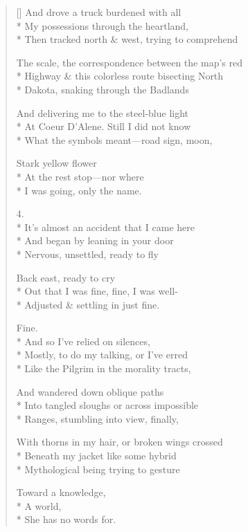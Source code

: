 \begin{verse}[\versewidth]
And drove a truck burdened with all\\*
My possessions through the heartland,\\*
Then tracked north \& west, trying to comprehend

The scale, the correspondence between the map's red\\*
Highway \& this colorless route bisecting North\\*
Dakota, snaking through the Badlands

And delivering me to the steel-blue light\\*
At Coeur D'Alene. Still I did not know\\*
What the symbols meant---road sign, moon,

Stark yellow flower\\*
At the rest stop---nor where\\*
I was going, only the name.

4.\\*
It's almost an accident that I came here\\*
And began by leaning in your door\\*
Nervous, unsettled, ready to fly

Back east, ready to cry\\*
Out that I was fine, fine, I was well-\\*
Adjusted \& settling in just fine.

Fine.\\*
 \qquad And so I've relied on silences,\\*
Mostly, to do my talking, or I've erred\\*
Like the Pilgrim in the morality tracts,

And wandered down oblique paths\\*
Into tangled sloughs or across impossible\\*
Ranges, stumbling into view, finally,

With thorns in my hair, or broken wings crossed\\*
Beneath my jacket like some hybrid\\*
Mythological being trying to gesture

Toward a knowledge,\\*
A world,\\*
She has no words for.
\end{verse}

